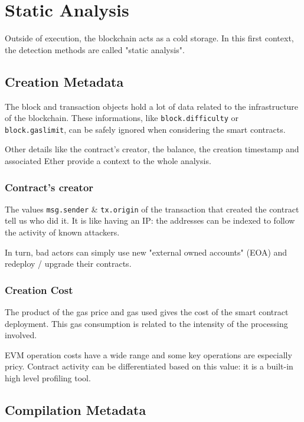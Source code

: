 \section{Static Analysis} \label{sec:data-static}

Outside of execution, the blockchain acts as a cold storage.
In this first context, the detection methods are called "static analysis".

\subsection{Creation Metadata}

The block and transaction objects hold a lot of data related to the infrastructure of the blockchain.
These informations, like \lstinline[language=Solidity]{block.difficulty} or \lstinline[language=Solidity]{block.gaslimit}, can be safely ignored when considering the smart contracts.

Other details like the contract's creator, the balance, the creation timestamp and associated Ether provide a context to the whole analysis.

\subsubsection{Contract's creator}

The values \lstinline[language=Solidity]{msg.sender} \& \lstinline[language=Solidity]{tx.origin} of the transaction that created the contract tell us who did it.
It is like having an IP: the addresses can be indexed to follow the activity of known attackers.

In turn, bad actors can simply use new "external owned accounts" (EOA) and redeploy / upgrade their contracts.

\subsubsection{Creation Cost}

The product of the gas price and gas used gives the cost of the smart contract deployment.
This gas consumption is related to the intensity of the processing involved.

EVM operation costs have a wide range and some key operations are especially pricy.
Contract activity can be differentiated based on this value: it is a built-in high level profiling tool.

\subsection{Compilation Metadata}

